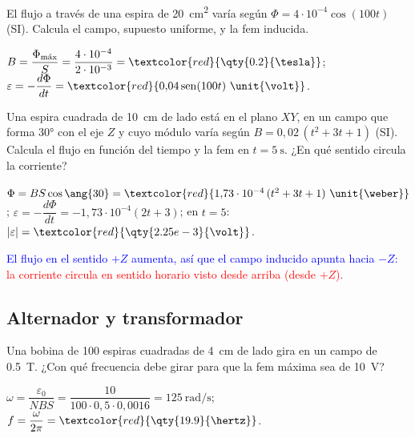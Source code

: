 \begin{exercise}
    El flujo a través de una espira de \qty{20}{\cm\squared} varía según \(\Phi = 4\cdot 10^{-4}\cos(100t)\) (SI). Calcula el campo, supuesto
    uniforme, y la fem inducida.
    \begin{solu}
        \(B = \dfrac{\Phi_{\text{máx}}}{S} = \dfrac{4\cdot 10^{-4}}{2\cdot 10^{-3}} = \textcolor{red}{\qty{0.2}{\tesla}}\);
        \(\varepsilon = -\dfrac{d\Phi}{dt} = \textcolor{red}{0{,}04\sen(100t)\ \unit{\volt}}\).
    \end{solu}
\end{exercise}

\begin{exercise}
    Una espira cuadrada de \qty{10}{\cm} de lado está en el plano \(XY\), en un campo que forma \ang{30} con el eje \(Z\) y cuyo módulo varía
    según \(B = 0{,}02\,(t^2 + 3t + 1)\) (SI). Calcula el flujo en función del tiempo y la fem en \(t = \qty{5}{\second}\). ¿En qué sentido circula
    la corriente?
    \begin{solu}
        \(\Phi = B S\cos\ang{30} = \textcolor{red}{1{,}73\cdot 10^{-4}\,(t^2 + 3t + 1)\ \unit{\weber}}\);
        \(\varepsilon = -\dfrac{d\Phi}{dt} = -1{,}73\cdot 10^{-4}(2t + 3)\); en \(t = 5\): \(|\varepsilon| = \textcolor{red}{\qty{2.25e-3}{\volt}}\).

        \textcolor{blue}{El flujo en el sentido \(+Z\) aumenta, así que el campo inducido apunta hacia \(-Z\):} \textcolor{red}{la corriente circula en sentido
        horario visto desde arriba (desde \(+Z\)).}
    \end{solu}
\end{exercise}

\subsection{Alternador y transformador}

\begin{exercise}
    Una bobina de 100 espiras cuadradas de \qty{4}{\cm} de lado gira en un campo de \qty{0.5}{\tesla}. ¿Con qué frecuencia debe girar para
    que la fem máxima sea de \qty{10}{\volt}?
    \begin{solu}
        \(\omega = \dfrac{\varepsilon_0}{NBS} = \dfrac{10}{100\cdot 0{,}5\cdot 0{,}0016} = \qty{125}{\radian\per\second}\);
        \(f = \dfrac{\omega}{2\pi} = \textcolor{red}{\qty{19.9}{\hertz}}\).
    \end{solu}
\end{exercise}


